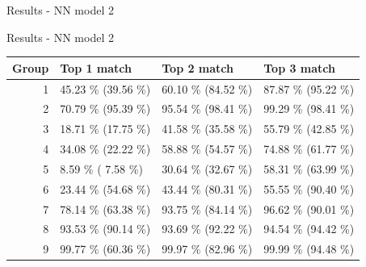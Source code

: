 \documentclass{beamer}
\newcommand\Fontsmall{\fontsize{8}{7.2}\selectfont}
\begin{document}
\begin{darkframes}
\begin{frame}{Results - NN model 2}
\begin{figure}[H]
\begin{minipage}{.33\textwidth}
        \end{minipage}%
      \end{figure}
    \end{frame}

    \begin{frame}{Results - NN model 2}
      \Fontsmall
      \begin{table}[!b]
        {\carlitoTLF %
        \begin{tabularx}{\textwidth}{r|X|X|X}
\toprule
          Group & Top 1 match                     & Top 2 match                     & Top 3 match                     \\
\bottomrule
1     & 45.23 \% {\color[HTML]{9B9B9B} (39.56 \%)} & 60.10 \% {\color[HTML]{9B9B9B} (84.52 \%)} & 87.87 \% {\color[HTML]{9B9B9B} (95.22 \%)} \\

2     & 70.79 \% {\color[HTML]{9B9B9B} (95.39 \%)} & 95.54 \% {\color[HTML]{9B9B9B} (98.41 \%)} & 99.29 \% {\color[HTML]{9B9B9B} (98.41 \%)} \\

3     & 18.71 \% {\color[HTML]{9B9B9B} (17.75 \%)} & 41.58 \% {\color[HTML]{9B9B9B} (35.58 \%)} & 55.79 \% {\color[HTML]{9B9B9B} (42.85 \%)} \\

4     & 34.08 \% {\color[HTML]{9B9B9B} (22.22 \%)} & 58.88 \% {\color[HTML]{9B9B9B} (54.57 \%)} & 74.88 \% {\color[HTML]{9B9B9B} (61.77 \%)} \\

5     & 8.59 \% {\color[HTML]{9B9B9B}( 7.58 \%)}  & 30.64 \% {\color[HTML]{9B9B9B} (32.67 \%)} & 58.31 \% {\color[HTML]{9B9B9B} (63.99 \%)} \\

6     & 23.44 \% {\color[HTML]{9B9B9B} (54.68 \%)} & 43.44 \% {\color[HTML]{9B9B9B} (80.31 \%)} & 55.55 \% {\color[HTML]{9B9B9B} (90.40 \%)} \\

7     & 78.14 \% {\color[HTML]{9B9B9B} (63.38 \%)} & 93.75 \% {\color[HTML]{9B9B9B} (84.14 \%)} & 96.62 \% {\color[HTML]{9B9B9B} (90.01 \%)} \\

8     & 93.53 \% {\color[HTML]{9B9B9B} (90.14 \%)} & 93.69 \% {\color[HTML]{9B9B9B} (92.22 \%)} & 94.54 \% {\color[HTML]{9B9B9B} (94.42 \%)} \\

9     & 99.77 \% {\color[HTML]{9B9B9B} (60.36 \%)} & 99.97 \% {\color[HTML]{9B9B9B} (82.96 \%)} & 99.99 \% {\color[HTML]{9B9B9B} (94.48 \%)} \\


\end{tabularx}}
\end{table}
\end{frame}
\end{darkframes}
\end{document}
